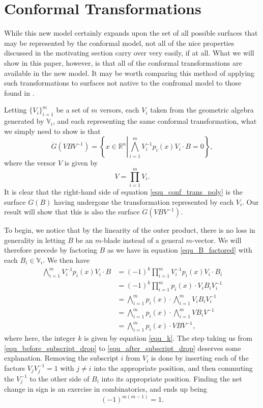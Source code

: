 \documentclass{ecgd-l}
\theoremstyle{definition}
\theoremstyle{remark}
\numberwithin{equation}{section}
\newcommand{\R}{\mathbb{R}}
\newcommand{\V}{\mathbb{V}}
\newcommand{\Gd}{\dot{G}}
\begin{document}
\section{Conformal Transformations}

While this new model certainly expands upon the set of all possible surfaces that may
be represented by
the conformal model, not all of the nice properties discussed in the motivating section
carry over very easily, if at all.
What we will show in this paper, however, is that all of the conformal transformations
are available in the new model.  It may be worth comparing this method
of applying such transformations to surfaces not native to the confromal model
to those found in \cite{Sobczyk12,Lasenby05}.

Letting $\{V_i\}_{i=1}^m$ be a set of $m$ versors, each $V_i$ taken from the
geometric algebra generated by $\V_i$, and each representing the same
conformal transformation, what we simply need to show is that
\begin{equation}\label{equ_conf_trans_poly}
\Gd(VBV^{-1}) = \left\{x\in\R^n\left|\bigwedge_{i=1}^m V_i^{-1}p_i(x)V_i\cdot B=0\right\}\right.,
\end{equation}
where the versor $V$ is given by
\begin{equation*}
V = \prod_{i=1}^m V_i.
\end{equation*}
It is clear that the right-hand side of equation \eqref{equ_conf_trans_poly} is
the surface $\Gd(B)$ having undergone the transformation represented by each $V_i$.
Our result will show that this is also the surface $\Gd(VBV^{-1})$.

To begin, we notice that by the linearity of the outer product, there is no loss
in generality in letting $B$ be an $m$-blade instead of a general $m$-vector.
We will therefore precede by factoring $B$ as we have in equation \eqref{equ_B_factored}
with each $B_i\in\V_i$.  We then have
\begin{align}
\bigwedge_{i=1}^m V_i^{-1}p_i(x)V_i\cdot B\nonumber
&= (-1)^k\prod_{i=1}^m V_i^{-1}p_i(x)V_i\cdot B_i\nonumber \\
&= (-1)^k\prod_{i=1}^m p_i(x)\cdot V_iB_iV_i^{-1}\nonumber \\
&=\bigwedge_{i=1}^m p_i(x)\cdot\bigwedge_{i=1}^m V_iB_iV_i^{-1}\label{equ_before_subscript_drop} \\
&=\bigwedge_{i=1}^m p_i(x)\cdot\bigwedge_{i=1}^m VB_iV^{-1}\label{equ_after_subscript_drop} \\
&=\bigwedge_{i=1}^m p_i(x)\cdot VBV^{-1},\nonumber
\end{align}
where here, the integer $k$ is given by equation \eqref{equ_k}.  The step taking us from
\eqref{equ_before_subscript_drop} to \eqref{equ_after_subscript_drop} deserves some explanation.
Removing the subscript $i$ from $V_i$ is done by inserting each of the factors $V_jV_j^{-1}=1$ with $j\neq i$
into the appropriate position, and then
commuting the $V_j^{-1}$ to the other side of $B_i$ into its appropriate position.  Finding the net change in sign
is an exercise in combinatorics, and ends up being
\begin{equation*}
(-1)^{m(m-1)}=1.
\end{equation*}
\end{document}
